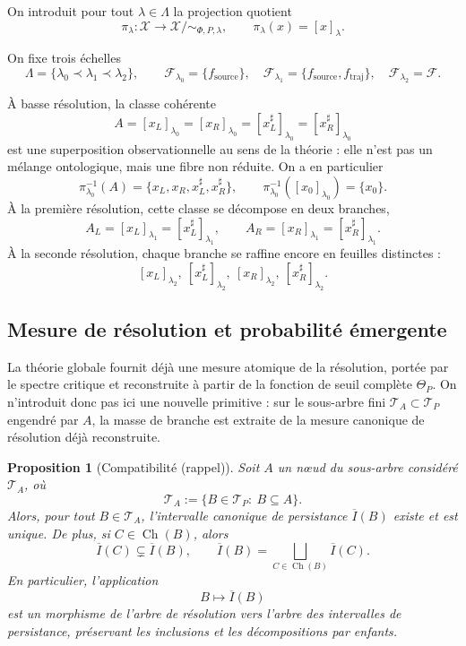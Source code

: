 \documentclass[11pt,a4paper]{article}
\newtheorem{proposition}{Proposition}
\begin{document}
\begin{appendices}
On introduit pour tout \(\lambda\in\Lambda\) la projection quotient
\[
\pi_\lambda:\mathcal X\longrightarrow \mathcal X/{\sim_{\Phi,P,\lambda}},
\qquad
\pi_\lambda(x)=[x]_\lambda.
\]

On fixe trois échelles
\[
\Lambda=\{\lambda_0\prec\lambda_1\prec\lambda_2\},
\qquad
\mathcal F_{\lambda_0}=\{f_{\mathrm{source}}\},\quad
\mathcal F_{\lambda_1}=\{f_{\mathrm{source}},f_{\mathrm{traj}}\},\quad
\mathcal F_{\lambda_2}=\mathcal F.
\]

À basse résolution, la classe cohérente
\[
A=[x_L]_{\lambda_0}=[x_R]_{\lambda_0}=[x_L^\sharp]_{\lambda_0}=[x_R^\sharp]_{\lambda_0}
\]
est une superposition observationnelle au sens de la théorie : elle n'est pas un mélange ontologique, mais une fibre non réduite. On a en particulier
\[
\pi_{\lambda_0}^{-1}(A)=\{x_L,x_R,x_L^\sharp,x_R^\sharp\},
\qquad
\pi_{\lambda_0}^{-1}([x_0]_{\lambda_0})=\{x_0\}.
\]
À la première résolution, cette classe se décompose en deux branches,
\[
A_L=[x_L]_{\lambda_1}=[x_L^\sharp]_{\lambda_1},
\qquad
A_R=[x_R]_{\lambda_1}=[x_R^\sharp]_{\lambda_1}.
\]
À la seconde résolution, chaque branche se raffine encore en feuilles distinctes :
\[
[x_L]_{\lambda_2},\ [x_L^\sharp]_{\lambda_2},\ [x_R]_{\lambda_2},\ [x_R^\sharp]_{\lambda_2}.
\]

\subsection*{Mesure de résolution et probabilité émergente}

La théorie globale fournit déjà une mesure atomique de la résolution, portée par le spectre critique et reconstruite à partir de la fonction de seuil complète \(\Theta_P\). On n'introduit donc pas ici une nouvelle primitive : sur le sous-arbre fini \(\mathcal T_A\subset\mathcal T_P\) engendré par \(A\), la masse de branche est extraite de la mesure canonique de résolution déjà reconstruite.

\begin{proposition}[Compatibilité (rappel)]
\label{prop:compatibilite-arbre-intervalles}
Soit \(A\) un nœud du sous-arbre considéré \(\mathcal T_A\), où
\[
\mathcal T_A:=\{B\in\mathcal T_P:\ B\subseteq A\}.
\]
Alors, pour tout \(B\in\mathcal T_A\), l'intervalle canonique de persistance \(\overline I(B)\) existe et est unique. De plus, si \(C\in\operatorname{Ch}(B)\), alors
\[
\overline I(C)\subsetneq \overline I(B),
\qquad
\overline I(B)=\bigsqcup_{C\in\operatorname{Ch}(B)}\overline I(C).
\]
En particulier, l'application
\[
B\longmapsto \overline I(B)
\]
est un morphisme de l'arbre de résolution vers l'arbre des intervalles de persistance, préservant les inclusions et les décompositions par enfants.
\end{proposition}


\end{appendices}
\end{document}
